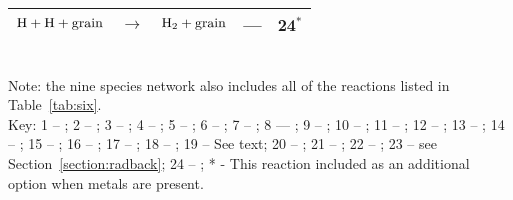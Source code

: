 \begin{table}
\begin{tabular}{lclcc}
${\rm H + H + grain}$ & $\rightarrow$ & ${\rm H_{2} + grain}$ & --- & 24$^{*}$ \\
\hline
\end{tabular}
\\ Note: the nine species network also includes all of the reactions listed in Table~\ref{tab:six}.
\\ Key: 1 -- \citet{1979MNRAS.187P..59W}; 2 --
\citet{1998ApJ...509....1S}; 3 -- \citet{2010Sci...329...69K}; 4 --
\citet{1976PhRvA..13...58R}; 5 -- \citet{2015MNRAS.446.3163L}; 6 --
\citet{1979JChPh..70.2877K}; 7 -- \citet{2002PhRvA..66d2717K}; 8 ---
\citet{2004ApJ...606L.167S,2004ApJ...607L.147S}; 9 --
\citet{2002PPCF...44.1263T}; 10 -- \citet{1996ApJ...461..265M}; 11 --
\citet{1987ephh.book.....J}; 12 -- \citet{1997NewA....2..181A}; 13 --
\citet{1986JPhB...19L..31F}; 14 -- \citet{1999MNRAS.304..327C}; 15 --
\citet{1978JPhB...11L.671P}; 16 -- \citet{1987ApJ...318...32S}; 17 --
\citet{1994ApJ...424..983S}; 18 -- \citet{1987IAUS..120..109D}; 19 --
See text; 20 -- \citet{1962JChPh..36.2923S}; 21 --
\citet{1970JChPh..53.4395H}; 22 -- \citet{1983JPCRD..12..531C}; 23 --
see Section~\ref{section:radback}; 24 -- \citet{1985ApJ...291..722T,
  2000ApJ...534..809O}; * - This reaction included as an additional
option when metals are present.
\end{table}

